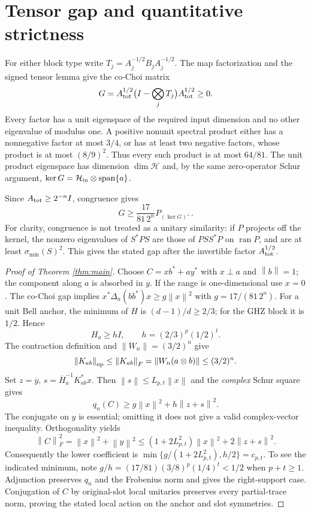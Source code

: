 \documentclass[11pt,a4paper]{article}
\newcommand{\ran}{\operatorname{ran}}
\newcommand{\HH}{\mathcal H}
\newcommand{\norm}[1]{\left\lVert#1\right\rVert}
\begin{document}
\section{Tensor gap and quantitative strictness}
For either block type write $T_j=A_j^{-1/2}B_jA_j^{-1/2}$. The map factorization and the signed tensor lemma give the co-Choi matrix
\[
 G=A_{\rm tot}^{1/2}\bigl(I-\bigotimes_j T_j\bigr)A_{\rm tot}^{1/2}\ge0.
\]
Every factor has a unit eigenspace of the required input dimension and no other eigenvalue of modulus one. A positive nonunit spectral product either has a nonnegative factor at most $3/4$, or has at least two negative factors, whose product is at most $(8/9)^2$. Thus every such product is at most $64/81$. The unit product eigenspace has dimension $\dim\HH$ and, by the same zero-operator Schur argument, $\ker G=\HH_{\rm in}\otimes\operatorname{span}\{a\}$.

Since $A_{\rm tot}\ge2^{-n}I$, congruence gives
\begin{equation}\label{eq:Ggap}
 G\ge\frac{17}{81\,2^n}P_{(\ker G)^\perp}.
\end{equation}
For clarity, congruence is not treated as a unitary similarity: if $P$ projects off the kernel, the nonzero eigenvalues of $S^*PS$ are those of $PSS^*P$ on $\ran P$, and are at least $\sigma_{\min}(S)^2$. This gives the stated gap after the invertible factor $A_{\rm tot}^{1/2}$.

\begin{proof}[Proof of Theorem \ref{thm:main}]
Choose $C=xb^*+ay^*$ with $x\perp a$ and $\norm b=1$; the component along $a$ is absorbed in $y$. If the range is one-dimensional use $x=0$. The co-Choi gap implies $x^*\Delta_a(bb^*)x\ge g\norm x^2$ with $g=17/(81\,2^n)$.
For a unit Bell anchor, the minimum of $H$ is $(d-1)/d\ge2/3$; for the GHZ block it is $1/2$. Hence
\[
 H_a\ge hI,\qquad h=(2/3)^p(1/2)^t.
\]
The contraction definition and $\norm{W_n}=(3/2)^n$ give
\[
 \norm{K_{ab}}_{\rm op}\le\norm{K_{ab}}_F
 =\norm{W_n(a\otimes b)}\le(3/2)^n.
\]
Set $z=\overline y$, $s=\overline H_a^{-1}K_{ab}^*x$. Then $\norm s\le L_{p,t}\norm x$ and the \emph{complex} Schur square gives
\[
 q_n(C)\ge g\norm x^2+h\norm{z+s}^2.
\]
The conjugate on $y$ is essential; omitting it does not give a valid complex-vector inequality. Orthogonality yields
\[
 \norm C_F^2=\norm x^2+\norm y^2
 \le(1+2L_{p,t}^2)\norm x^2+2\norm{z+s}^2.
\]
Consequently the lower coefficient is $\min\{g/(1+2L_{p,t}^2),h/2\}=c_{p,t}$. To see the indicated minimum, note $g/h=(17/81)(3/8)^p(1/4)^t<1/2$ when $p+t\ge1$. Adjunction preserves $q_n$ and the Frobenius norm and gives the right-support case. Conjugation of $C$ by original-slot local unitaries preserves every partial-trace norm, proving the stated local action on the anchor and slot symmetries.
\end{proof}
\end{document}
